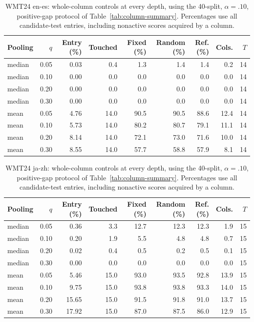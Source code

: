 \begin{table}[t]
\centering\small
\begin{tabular}{lrrrrrrrr}
\toprule
Pooling & $q$ & Entry (\%) & Touched & Fixed (\%) & Random (\%) & Ref. (\%) & Cols. & $T$ \\
\midrule
median & 0.05 & 0.03 & 0.4 & 1.3 & 1.4 & 1.4 & 0.2 & 14 \\
median & 0.10 & 0.00 & 0.0 & 0.0 & 0.0 & 0.0 & 0.0 & 14 \\
median & 0.20 & 0.00 & 0.0 & 0.0 & 0.0 & 0.0 & 0.0 & 14 \\
median & 0.30 & 0.00 & 0.0 & 0.0 & 0.0 & 0.0 & 0.0 & 14 \\
mean & 0.05 & 4.76 & 14.0 & 90.5 & 90.5 & 88.6 & 12.4 & 14 \\
mean & 0.10 & 5.73 & 14.0 & 80.2 & 80.7 & 79.1 & 11.1 & 14 \\
mean & 0.20 & 8.14 & 14.0 & 72.1 & 73.0 & 71.6 & 10.0 & 14 \\
mean & 0.30 & 8.55 & 14.0 & 57.7 & 58.8 & 57.9 & 8.1 & 14 \\
\bottomrule
\end{tabular}
\caption{WMT24 en-es: whole-column controls at every depth, using the 40-split, $\alpha=.10$, positive-gap protocol of Table~\ref{tab:column-summary}. Percentages use all candidate-test entries, including nonactive scores acquired by a column.}
\label{tab:column-all-4}
\end{table}

\begin{table}[t]
\centering\small
\begin{tabular}{lrrrrrrrr}
\toprule
Pooling & $q$ & Entry (\%) & Touched & Fixed (\%) & Random (\%) & Ref. (\%) & Cols. & $T$ \\
\midrule
median & 0.05 & 0.36 & 3.3 & 12.7 & 12.3 & 12.3 & 1.9 & 15 \\
median & 0.10 & 0.20 & 1.9 & 5.5 & 4.8 & 4.8 & 0.7 & 15 \\
median & 0.20 & 0.02 & 0.4 & 0.5 & 0.2 & 0.5 & 0.1 & 15 \\
median & 0.30 & 0.00 & 0.0 & 0.0 & 0.0 & 0.0 & 0.0 & 15 \\
mean & 0.05 & 5.46 & 15.0 & 93.0 & 93.5 & 92.8 & 13.9 & 15 \\
mean & 0.10 & 9.75 & 15.0 & 93.8 & 93.8 & 93.3 & 14.0 & 15 \\
mean & 0.20 & 15.65 & 15.0 & 91.5 & 91.8 & 91.0 & 13.7 & 15 \\
mean & 0.30 & 17.92 & 15.0 & 87.0 & 87.5 & 86.0 & 12.9 & 15 \\
\bottomrule
\end{tabular}
\caption{WMT24 ja-zh: whole-column controls at every depth, using the 40-split, $\alpha=.10$, positive-gap protocol of Table~\ref{tab:column-summary}. Percentages use all candidate-test entries, including nonactive scores acquired by a column.}
\label{tab:column-all-5}
\end{table}

